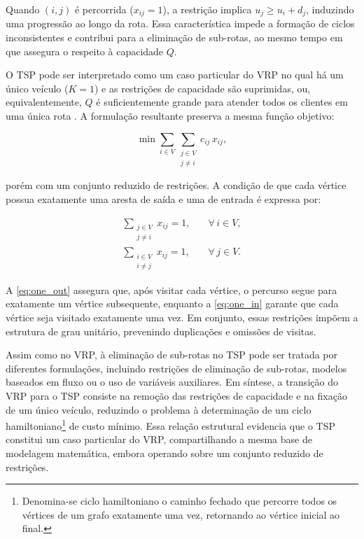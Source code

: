 Quando $(i,j)$ é percorrida ($x_{ij}=1$), a restrição implica $u_j \geq u_i + d_j$, induzindo uma progressão ao longo da rota. Essa característica impede a formação de ciclos inconsistentes e contribui para a eliminação de sub-rotas, ao mesmo tempo em que assegura o respeito à capacidade $Q$.

O TSP pode ser interpretado como um caso particular do VRP no qual há um único veículo ($K = 1$) \cite{toth2002vehicle} e as restrições de capacidade são suprimidas, ou, equivalentemente, $Q$ é suficientemente grande para atender todos os clientes em uma única rota \cite{balinski1964integer, eilon1974distribution}. A formulação resultante preserva a mesma função objetivo:

\begin{equation}
    \min \sum_{i \in V} \sum_{\substack{j \in V \\ j \neq i}} c_{ij}\, x_{ij},
\end{equation}

\noindent porém com um conjunto reduzido de restrições. A condição de que cada vértice possua exatamente uma aresta de saída e uma de entrada é expressa por:

\begin{eqnarray}
\sum_{\substack{j \in V \\ j \neq i}} x_{ij} = 1, & \quad \forall\, i \in V, \label{eq:one_out} \\[4pt]
\sum_{\substack{i \in V \\ i \neq j}} x_{ij} = 1, & \quad \forall\, j \in V. \label{eq:one_in}
\end{eqnarray}

A \autoref{eq:one_out} assegura que, após visitar cada vértice, o percurso segue para exatamente um vértice subsequente, enquanto a \autoref{eq:one_in} garante que cada vértice seja visitado exatamente uma vez. Em conjunto, essas restrições impõem a estrutura de grau unitário, prevenindo duplicações e omissões de visitas.

Assim como no VRP, à eliminação de sub-rotas no TSP pode ser tratada por diferentes formulações, incluindo restrições de eliminação de sub-rotas, modelos baseados em fluxo ou o uso de variáveis auxiliares. Em síntese, a transição do VRP para o TSP consiste na remoção das restrições de capacidade e na fixação de um único veículo, reduzindo o problema à determinação de um ciclo hamiltoniano\footnote{Denomina-se ciclo hamiltoniano o caminho fechado que percorre todos os vértices de um grafo exatamente uma vez, retornando ao vértice inicial ao final.} de custo mínimo. Essa relação estrutural evidencia que o TSP constitui um caso particular do VRP, compartilhando a mesma base de modelagem matemática, embora operando sobre um conjunto reduzido de restrições.

